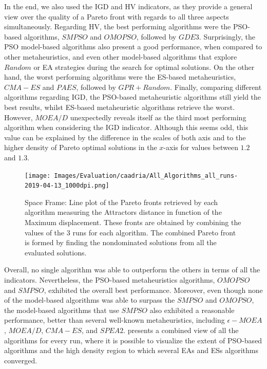 In the end, we also used the \ac{IGD} and \ac{HV} indicators, as they provide a general view over the quality of a Pareto front with regards to all three aspects simultaneously. Regarding \ac{HV}, the best performing algorithms were the \ac{PSO}-based algorithms, $SMPSO$ and $OMOPSO$, followed by $GDE3$. Surprisingly, the \ac{PSO} model-based algorithms also present a good performance, when compared to other metaheuristics, and even other model-based algorithms that explore $Random$ or \ac{EA} strategies during the search for optimal solutions. On the other hand, the worst performing algorithms were the \ac{ES}-based metaheuristics, $CMA-ES$ and $PAES$, followed by $GPR+Random$. Finally, comparing different algorithms regarding \ac{IGD}, the \ac{PSO}-based metaheuristic algorithms still yield the best results, whilst \ac{ES}-based metaheuristic algorithms retrieve the worst. However, $MOEA/D$ unexpectedly reveals itself as the third most performing algorithm when considering the \ac{IGD} indicator. Although this seems odd, this value can be explained by the difference in the scales of both axis and to the higher density of Pareto optimal solutions in the $x$-axis for values between $1.2$ and $1.3$.

\begin{figure}[htbp]
	\centering
	\texttt{[image: Images/Evaluation/caadria/All\_Algorithms\_all\_runs-2019-04-13\_1000dpi.png]}
	\caption[Space Frame: Pareto front plot]{Space Frame: Line plot of the Pareto fronts retrieved by each algorithm measuring the Attractors distance in function of the Maximum displacement. These fronts are obtained by combining the values of the $3$ runs for each algorithm. The combined Pareto front is formed by finding the nondominated solutions from all the evaluated solutions.}
	\label{fig:allruns}
\end{figure}

Overall, no single algorithm was able to outperform the others in terms of all the indicators. Nevertheless, the \ac{PSO}-based metaheuristics algorithms, $OMOPSO$ and $SMPSO$, exhibited the overall best performance. Moreover, even though none of the model-based algorithms was able to surpass the $SMPSO$ and $OMOPSO$, the model-based algorithms that use $SMPSO$ also exhibited a reasonable performance, better than several well-known metaheuristics, including $\epsilon-MOEA$, $MOEA/D$, $CMA-ES$, and $SPEA2$.  presents a combined view of all the algorithms for every run, where it is possible to visualize the extent of \ac{PSO}-based algorithms and the high density region to which several \acp{EA} and \acp{ES} algorithms converged.


